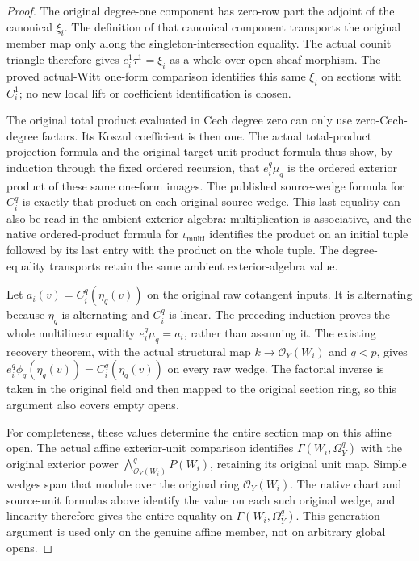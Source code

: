 \begin{proof}
\leanok
The original degree-one component has zero-row part the adjoint of the
canonical $\xi_i$. The definition of that canonical component transports
the original member map only along the singleton-intersection equality.
The actual counit triangle therefore gives
$e_i^1\tau^1=\xi_i$ as a whole over-open sheaf morphism. The proved
actual-Witt one-form comparison identifies this same $\xi_i$ on sections
with $C_i^1$; no new local lift or coefficient identification is chosen.

The original total product evaluated in Cech degree zero can only use
zero-Cech-degree factors. Its Koszul coefficient is then one. The actual
total-product projection formula and the original target-unit product
formula thus show, by induction through the fixed ordered recursion,
that $e_i^q\mu_q$ is the ordered exterior product of these same one-form
images. The published source-wedge formula for $C_i^q$ is exactly that
product on each original source wedge. This last equality can also be
read in the ambient exterior algebra: multiplication is associative,
and the native ordered-product formula for $\iota_{\mathrm{multi}}$
identifies the product on an initial tuple followed by its last entry
with the product on the whole tuple. The degree-equality transports
retain the same ambient exterior-algebra value.

Let $a_i(v)=C_i^q(\eta_q(v))$ on the original raw cotangent inputs.
It is alternating because $\eta_q$ is alternating and $C_i^q$ is linear.
The preceding induction proves the whole multilinear equality
$e_i^q\mu_q=a_i$, rather than assuming it. The existing recovery theorem,
with the actual structural map $k\to\mathcal O_Y(W_i)$ and $q<p$, gives
$e_i^q\phi_q(\eta_q(v))=C_i^q(\eta_q(v))$ on every raw wedge.
The factorial inverse is taken in the original field and then mapped
to the original section ring, so this argument also covers empty opens.

For completeness, these values determine the entire section map on
this affine open. The actual affine exterior-unit comparison identifies
$\Gamma(W_i,\Omega_Y^q)$ with the original exterior power
$\bigwedge^q_{\mathcal O_Y(W_i)}P(W_i)$, retaining its original unit map.
Simple wedges span that module over the original ring
$\mathcal O_Y(W_i)$. The native chart and source-unit formulas above
identify the value on each such original wedge, and linearity therefore
gives the entire equality on $\Gamma(W_i,\Omega_Y^q)$. This generation argument
is used only on the genuine affine member, not on arbitrary global opens.

\end{proof}
